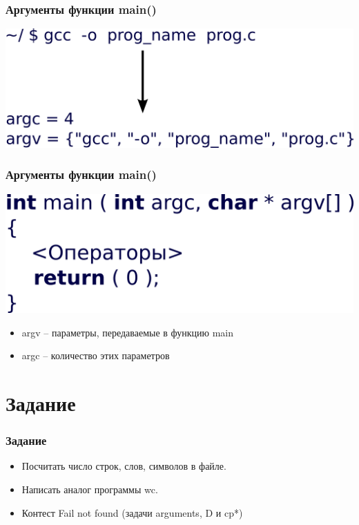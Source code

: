 \documentclass[12pt,pdf,hyperref={unicode}]{beamer}
\begin{document}
\begin{frame}[fragile]
\frametitle{Аргументы функции main()} 
\begin{center}
\includegraphics[width=1.0\linewidth]{images/function_argcargv.png}
\end{center}
\end{frame}

\begin{frame}[fragile]
\frametitle{Аргументы функции main()}  
\begin{center}
\includegraphics[width=0.7\linewidth]{images/function_syntax_main_args.png}
\end{center}
\begin{itemize}
\item argv -- параметры, передаваемые в функцию main
\item argc -- количество этих параметров
\end{itemize}
\end{frame}





\section{Задание}

\begin{frame}[fragile]
\frametitle{Задание} 
\begin{itemize}
\item Посчитать число строк, слов, символов в файле.
\item Написать аналог программы wc.
\item Контест Fail not found (задачи arguments, D и cp*)
\end{itemize}
\end{frame}
\end{document}
